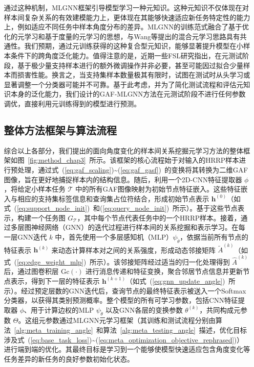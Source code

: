 通过这种机制，MLGNN框架引导模型学习一种元知识。这种元知识不仅体现在对样本间复杂关系的有效建模能力上，更体现在其能够快速适应新任务特定性的能力上，例如适应不同任务中样本角度分布的差异。MLGNN的训练范式融合了基于优化的元学习和基于度量的元学习的思想，与Wang等提出的混合元学习思路具有共通性。我们预期，通过元训练获得的这种复合型元知识，能够显著提升模型在小样本条件下的跨角度泛化能力。值得注意的是，近期一些FSL研究指出，在元测试阶段，基于极少量支持样本进行的额外微调操作并非必要，甚至可能因过拟合少量样本而损害性能。换言之，当支持集样本数量极其有限时，试图在测试时从头学习或显著调整一个分类器可能并不可靠。基于此考虑，并为了简化测试流程和评估元知识本身的泛化能力，我们设计的GAF-MLGNN方法在元测试阶段不进行任何参数调优，直接利用元训练得到的模型进行预测。

\subsection{整体方法框架与算法流程}
\label{subsec:overall_framework_angle}

综合以上各部分，我们提出的面向角度变化的样本间关系挖掘元学习方法的整体框架如图~\ref{fig:method_chap3}~所示。该框架的核心流程始于对输入的HRRP样本进行预处理，通过式~(\ref{eq:gaf_scaling})\textasciitilde(\ref{eq:gaf_gasf})~的变换将其转换为二维GAF图像，旨在更好地捕捉样本内的结构信息。随后，利用一个2D-CNN特征提取器 $\phi$，将给定小样本任务 $\mathcal{T}$ 中的所有GAF图像映射为初始节点特征嵌入。这些特征嵌入与相应的支持集标签信息和查询集占位符结合，形成初始节点表示 $\mathbf{h}^{(0)}$（如式~(\ref{eq:support_node_init})~和(\ref{eq:query_node_init})~所示）。基于这些节点表示，构建一个任务图 $G_{\mathcal{T}}$，其中每个节点代表任务中的一个HRRP样本。接着，通过多层图神经网络（GNN）的迭代过程进行样本间的关系挖掘和表示学习。在每一层GNN迭代 $k$ 中，首先使用一个多层感知机（MLP）$\psi_{\tilde{\theta}}$，依据当前所有节点的特征表示 $\mathbf{h}^{(k)}$ 来动态计算样本对之间的关系强度，形成动态邻接矩阵 $\tilde{A}^{(k)}$（如式~(\ref{eq:edge_weight_mlp})~所示）。该邻接矩阵经过适当的归一化处理得到 $\hat{A}^{(k)}$ 后，通过图卷积层 $\mathrm{Gc}(\cdot)$ 进行消息传递和特征变换，聚合邻居节点信息并更新节点表示，得到下一层的特征表示 $\mathbf{h}^{(k+1)}$（如式~(\ref{eq:gnn_update_angle})~所示）。经过预定层数的GNN迭代后，查询节点的最终特征表示被送入一个Softmax分类器，以获得其类别预测概率。整个模型的所有可学习参数，包括CNN特征提取器 $\phi$、用于计算边权的MLP $\psi_{\tilde{\theta}}$ 以及GNN各层的变换参数 $\theta^{(k)}$，共同构成元参数 $\Theta$。这组元参数通过MLGNN元学习框架（其训练和测试流程分别由算法~\ref{alg:meta_training_angle}~和算法~\ref{alg:meta_testing_angle}~描述，优化目标涉及式~(\ref{eq:base_task_loss})\textasciitilde(\ref{eq:meta_optimization_objective_rephrased})）进行端到端的优化。其最终目标是学习到一个能够使模型快速适应包含角度变化等任务差异的新任务的良好参数初始化状态。

